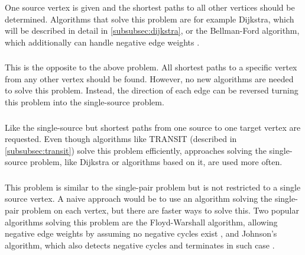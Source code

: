 		\subsubsection{}
		\label{subsubsec:single-source-shortest-path}
		
			One source vertex is given and the shortest paths to all other vertices should be determined.
			Algorithms that solve this problem are for example Dijkstra, which will be described in detail in \cref{subsubsec:dijkstra}, or the Bellman-Ford algorithm, which additionally can handle negative edge weights \cite[651]{cormen-introduction-to-alg}.
		
		\subsubsection{}
		
			This is the opposite to the above problem.
			All shortest paths to a specific vertex from any other vertex should be found.
			However, no new algorithms are needed to solve this problem.
			Instead, the direction of each edge can be reversed turning this problem into the single-source problem.
		
		\subsubsection{}
		
			Like the single-source but shortest paths from one source to one target vertex are requested.
			Even though algorithms like TRANSIT (described in \cref{subsubsec:transit}) solve this problem efficiently, approaches solving the single-source problem, like Dijkstra or algorithms based on it, are used more often.
		
		\subsubsection{}
		\label{subsubsec:all-pair-shortest-path}
		
			This problem is similar to the single-pair problem but is not restricted to a single source vertex.
			A naive approach would be to use an algorithm solving the single-pair problem on each vertex, but there are faster ways to solve this.
			Two popular algorithms solving this problem are the Floyd-Warshall algorithm, allowing negative edge weights by assuming no negative cycles exist \cite[693]{cormen-introduction-to-alg}, and Johnson's algorithm, which also detects negative cycles and terminates in such case \cite[700]{cormen-introduction-to-alg}.
		
